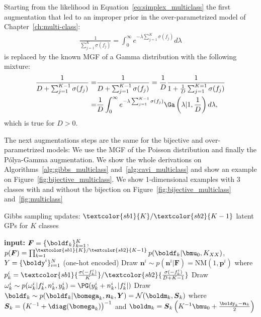 Starting from the likelihood in Equation~\ref{eq:simplex_multiclass} the first augmentation that led to an improper prior in the over-parametrized model of Chapter~\ref{ch:multi-class}:
\begin{align*}
    \frac{1}{\sum_{j=1}^{K} \sigma(f_j)} = \int_0^\infty e^{-\lambda  \sum_{j=1}^{K} \sigma(f_j)}d\lambda
\end{align*}
is replaced by the known \ac{MGF} of a Gamma distribution with the following mixture:
\begin{align*}
    \frac{1}{D + \sum_{j=1}^{K-1} \sigma(f_j)} =& \frac{1}{D + \sum_{j=1}^{K-1} \sigma(f_j)} = \frac{1}{D}\frac{1}{1+\frac{1}{D}\sum_{j=1}^{K=1}\sigma(f_j)}\\
    =& \frac{1}{D}\int_0^\infty e^{-\lambda \sum_{j=1}^{K-1} \sigma(f_j)}\Ga \left(\lambda|1, \frac{1}{D}\right)d\lambda,
\end{align*}
which is true for $D > 0$.

The next augmentations steps are the same for the bijective and over-parametrized models:
We use the \ac{MGF} of the Poisson distribution and finally the P\'olya-Gamma augmentation.
We show the whole derivations on Algorithms~\ref{alg:gibbs_multiclass} and~\ref{alg:cavi_multiclass} and show an example on Figure~\ref{fig:bijective_multiclass}.
We show 1-dimensional examples with 3 classes with and without the bijection on Figure~\ref{fig:bijective_multiclass} and~\ref{fig:multiclass}
\begin{algorithm}[H]
    \caption{Gibbs sampling updates: $\textcolor{sb1}{K}/\textcolor{sb2}{K - 1}$ latent \ac{GPs} for $K$ classes}
    \begin{algorithmic}
    \State \textbf{input:} $\boldsymbol{F} = \{\boldf_k\}_{k=1}^K$, $p(\boldsymbol{F}) = \prod_{k=1}^{\textcolor{sb1}{K}/\textcolor{sb2}{K - 1}} p(\boldf_k|\bmu_0, K_{XX})$, $Y=\{\boldy^i\}_{i=1}^N$ (one-hot encoded)
        \State Draw $\boldsymbol{n}^i \sim p(\boldsymbol{n}^i|\boldsymbol{F}) = \mathrm{NM}(1, \boldsymbol{p}^i)$ where 
        $p_k^i = \textcolor{sb1}{\frac{\sigma(-f_k^i)}{K}}/\textcolor{sb2}{\frac{\sigma(-f_k^i)}{D + K - 1}}$
        \State Draw $\omega_k^i \sim p(\omega_k^i|f_k^i, n_k^i, y_k^i) = \PG(y_k^i + n^i_k, |f_k^i|)$
        \State Draw $\boldf_k \sim p(\boldf_k|\bomega_k,\boldsymbol{n}_k, \boldsymbol{Y}) = \mathcal{N}(\boldm_k, \boldsymbol{S}_k)$
        \State where $\boldsymbol{S}_k = \left(K^{-1} + \diag(\bomega_k)\right)^{-1}$ and $\boldm_k = \boldsymbol{S}_k\left(K^{-1}\bmu_0 + \frac{\boldy_k - \boldsymbol{n}_k}{2}\right)$
    \EndFor
    \end{algorithmic}
    \label{alg:gibbs_multiclass}
\end{algorithm}

